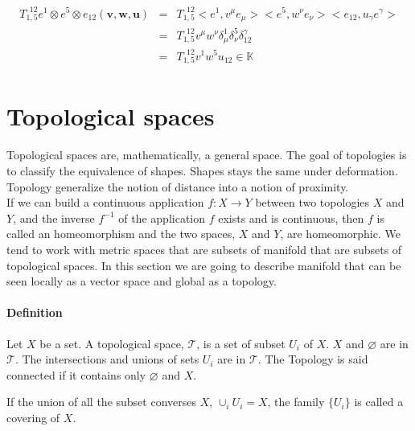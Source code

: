 \documentclass[final, paper=letter,5p,times,twocolumn]{elsarticle}
\theoremstyle{definition}
\begin{document}
\begin{eqnarray*}
  \begin{array}{rcl}
    T_{1,5}^{~~12}e^{1} \otimes e^{5}\otimes e_{12}(\bm{v}, \bm{w}, \bm{u}) & = & T_{1,5}^{~~12} <e^{1},v^{\mu}e_{\mu}><e^{5},w^{\nu}e_{\nu}><e_{12},u_{\gamma}e^{\gamma}> \\
    & = & T_{1,5}^{~~12} v^{\mu}w^{\nu} \delta_{\mu}^{1} \delta_{\nu}^{5} \delta_{12}^{\gamma} \\
    & = & T_{1,5}^{~~12} v^{1}w^{5}u_{12} \in \mathbb{K}
  \end{array}
\end{eqnarray*}



\section{Topological spaces}

Topological spaces are, mathematically, a general space. The goal of topologies is to classify the equivalence of shapes. Shapes stays the same under deformation. Topology generalize the notion of distance into a notion of proximity. \\
If we can build a continuous application $f : X \rightarrow Y$ between two topologies $X$ and $Y$, and the inverse $f^{-1}$ of the application $f$ exists and is continuous, then $f$ is called an homeomorphism and the two spaces, $X$ and $Y$, are homeomorphic.
We tend to work with metric spaces that are subsets of manifold that are subsets of topological spaces. In this section we are going to describe manifold that can be seen locally as a vector space and global as a topology.

\paragraph{Definition}{Let $X$ be a set. A topological space, $\mathcal{T}$, is a set of subset $U_{i}$ of $X$. $X$ and $\varnothing$ are in $\mathcal{T}$. The intersections and unions of sets $U_{i}$ are in $\mathcal{T}$. The Topology is said connected if it contains only $\varnothing$ and $X$.\\
}

If the union of all the subset converses $X$, $\cup_{i} U_{i} = X$, the family $\{U_{i} \}$ is called a covering of $X$.
\end{document}
